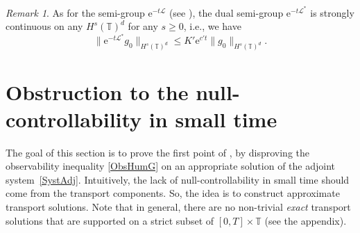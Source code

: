 \documentclass[11pt]{article}
\newcommand{\ie}{i.e.,\xspace}
\let\mathcal\mathscr
\theoremstyle{plain}
\theoremstyle{definition}
\theoremstyle{remark}
\newtheorem{remark}[theorem]{Remark}
\newcommand{\set}{\mathbb}
\newcommand{\T}{\set{T}}
\newcommand{\eu}{\mathrm e}
\begin{document}
\begin{remark}\label{rk:semigroup*_Hs}
As for the semi-group $\eu^{-t\mathcal L}$ (see ), the dual semi-group $\eu^{-t\mathcal L^*}$ is strongly continuous on any $H^s(\T)^d$ for any $s\geq 0$, \ie we have
\[
\|\eu^{-t\mathcal L^*} g_0\|_{H^s(\T)^d} \leq K'\eu^{c' t}\|g_0\|_{H^s(\T)^d}.
\]
\end{remark}

\section{Obstruction to the null-controllability in small time} \label{Sec:Obst}

The goal of this section is to prove the first point of , by disproving the observability inequality \eqref{ObsHumG} on an appropriate solution of the adjoint system~\eqref{SystAdj}. Intuitively, the lack of null-controllability in small time should come from the transport components. So, the idea is to construct approximate transport solutions. Note that in general, there are no non-trivial \emph{exact} transport solutions that are supported on a strict subset of $[0,T]\times \set T$ (see the appendix).
\end{document}
